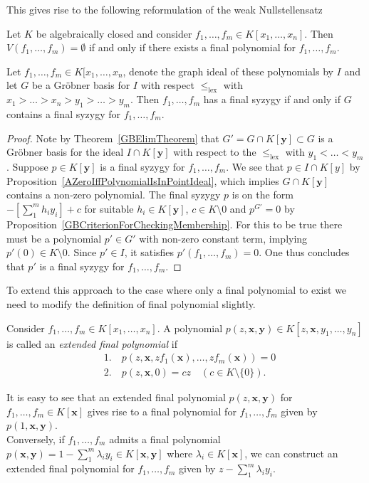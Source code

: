This gives rise to the following reformulation of the weak Nullstellensatz
\begin{theorem}
    Let $K$ be algebraically closed and consider $f_1,\dots,f_m\in K[x_1,\dots,x_n]$. Then $V(f_1,\dots,f_m)=\emptyset$ if and only if there exists a final polynomial for $f_1,\dots,f_m$.
\end{theorem}
\begin{proposition}\label{GröbnerBasisTheoremForFinalPolynomials}
    Let $f_1,\dots,f_m\in K[x_1,\dots,x_n$, denote the graph ideal of these polynomials by $I$ and let $G$ be a Gröbner basis for $I$ with respect $\leq_{\text{lex}}$ with $x_1>\dots>x_n>y_1>\dots>y_m$. Then $f_1,\dots,f_m$ has a final syzygy if and only if $G$ contains a final syzygy for $f_1,\dots,f_m$.
\end{proposition}
\begin{proof}
    Note by Theorem~\ref{GBElimTheorem} that $G'=G \cap K[\mathbf{y}] \subset G$ is a Gröbner basis for the ideal $I \cap K[\mathbf{y}]$ with respect to the $\leq_{\text{lex}}$ with $y_1<\dots <y_m$. Suppose $p\in K[\mathbf{y}]$ is a final syzygy for $f_1,\dots,f_m$. We see that $p\in I \cap K[y]$ by Proposition~\ref{AZeroIffPolynomialIsInPointIdeal}, which implies $\widehat{G} \cap K[\mathbf{y}]$ contains a non-zero polynomial. The final syzygy $p$ is on the form $-\left[\sum_{1}^m h_iy_i\right] + c$ for suitable $h_i\in K[\mathbf{y}]$, $c\in K\setminus 0$ and $p^{G'}=0$ by Proposition~\ref{GBCriterionForCheckingMembership}. For this to be true there must be a polynomial $p' \in G'$ with non-zero constant term, implying $p'(0)\in K\setminus 0$. Since $p'\in I$, it satisfies $p'(f_1,\dots,f_m)=0$. One thus concludes that $p'$  is a final syzygy for $f_1,\dots,f_m$.
\end{proof}
To extend this approach to the case where only a final polynomial to exist we need to modify the definition of final polynomial slightly.
\begin{definition}
    Consider $f_1,\dots,f_m\in K[x_1,\dots,x_n]$. A polynomial $p(z,\mathbf{x},\mathbf{y})\in K[z,\mathbf{x},y_1,\dots,y_n]$ is called an \textit{extended final polynomial} if 
    \begin{align*}
        &1.\quad p(z,\mathbf{x},zf_1(\mathbf{x}),\dots, zf_m(\mathbf{x})) = 0\\
        &2. \quad p(z,\mathbf{x}, 0) = cz \quad (c\in K\setminus\{0\}).
    \end{align*}
\end{definition}
\begin{remark}\label{FinalPolIffExtendedFinalPol}
    It is easy to see that an extended final polynomial $p(z,\mathbf{x},\mathbf{y})$ for $f_1,\dots, f_m\in K[\mathbf{x}]$ gives rise to a final polynomial for $f_1,\dots,f_m$ given by $p(1,\mathbf{x},\mathbf{y})$. \\
    Conversely, if $f_1,\dots,f_m$ admits a final polynomial $p(\mathbf{x},\mathbf{y})= 1 - \sum_1^m \lambda_iy_i\in K[\mathbf{x},\mathbf{y}]$ where $\lambda_i\in K[\mathbf{x}]$, we can construct an extended final polynomial for $f_1,\dots,f_m$ given by $z-\sum_1^m \lambda_iy_i$.
\end{remark}
